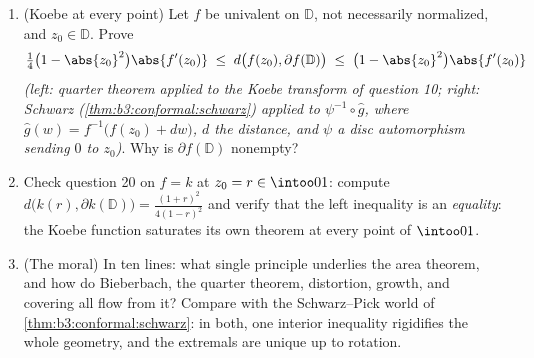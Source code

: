 \begin{problem}
\begin{enumerate}[resume]
\[        \]
        sharp for the Koebe function, and recover the
        quarter theorem as $r \to 1^-$. \emph{(Boundary
        points of the open image $f(D(0,r))$ lie on
        $f(\partial D(0,r))$, hence have modulus $\geq
        \frac{r}{(1+r)^2}$ by question 14; a segment from
        $0$ to a missed point of smaller modulus would have
        to cross that boundary.)}
  \item (Koebe at every point) Let $f$ be univalent on
        $\mathbb D$, not necessarily normalized, and $z_0
        \in \mathbb D$. Prove
        \[
        \tfrac14\bigl(1 - \abs{z_0}^2\bigr)\abs{f'(z_0)}
        \;\leq\;
        d\bigl(f(z_0), \partial f(\mathbb D)\bigr)
        \;\leq\;
        \bigl(1 - \abs{z_0}^2\bigr)\abs{f'(z_0)}
        \]
        \emph{(left: quarter theorem applied to the Koebe
        transform of question 10; right: Schwarz
        (\cref{thm:b3:conformal:schwarz}) applied to
        $\psi^{-1}\circ\hat g$, where $\hat g(w) =
        f^{-1}\bigl(f(z_0) + dw\bigr)$, $d$ the distance,
        and $\psi$ a disc automorphism sending $0$ to
        $z_0$)}. Why is $\partial f(\mathbb D)$ nonempty?
  \item Check question 20 on $f = k$ at $z_0 = r \in
        \intoo01$: compute $d\bigl(k(r), \partial k(\mathbb
        D)\bigr) = \frac{(1+r)^2}{4(1-r)^2}$ and verify that
        the left inequality is an \emph{equality}: the Koebe
        function saturates its own theorem at every point of
        $\intoo01$.
  \item (The moral) In ten lines: what single principle
        underlies the area theorem, and how do Bieberbach,
        the quarter theorem, distortion, growth, and
        covering all flow from it? Compare with the
        Schwarz--Pick world of
        \cref{thm:b3:conformal:schwarz}: in both, one
        interior inequality rigidifies the whole geometry,
        and the extremals are unique up to rotation.


\end{enumerate}
\end{problem}
